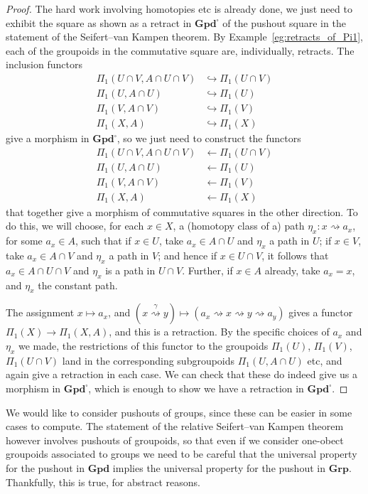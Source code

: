 \documentclass{tufte-handout}
\def\into {\hookrightarrow}
\def\Grp {\mathbf{Grp}}
\def\Gpd {\mathbf{Gpd}}
\theoremstyle{definition}
\begin{document}
\begin{proof}

The hard work involving homotopies etc is already done, we just need to exhibit the 
square as shown as a retract in $\Gpd^\square$ of the pushout square in the statement of 
the Seifert--van Kampen theorem. By Example~\ref{eg:retracts_of_Pi1}, each of the 
groupoids in the commutative square are, individually, retracts.
The inclusion functors
\begin{align*}
\Pi_1(U\cap V,A\cap U\cap V) & \into \Pi_1(U\cap V)\\
\Pi_1(U,A\cap U) & \into \Pi_1(U)\\
\Pi_1(V,A\cap V) & \into \Pi_1(V)\\
\Pi_1(X,A) & \into \Pi_1(X)
\end{align*}
give a morphism in $\Gpd^\square$, so we just need to construct the functors
\begin{align*}
\Pi_1(U\cap V,A\cap U\cap V) & \leftarrow \Pi_1(U\cap V)\\
\Pi_1(U,A\cap U) & \leftarrow \Pi_1(U)\\
\Pi_1(V,A\cap V) & \leftarrow \Pi_1(V)\\
\Pi_1(X,A) & \leftarrow \Pi_1(X)
\end{align*}
that together give a morphism of commutative squares in the other direction. To do this, 
we will choose, for each $x\in X$, a (homotopy class of a) path $\eta_x\colon 
x\rightsquigarrow a_x$, for some $a_x \in A$, such that if $x\in U$, take $a_x\in A\cap 
U$ and $\eta_x$ a path in $U$; if $x\in V$, take $a_x\in A\cap V$ and $\eta_x$ a path in 
$V$; and hence if $x\in U\cap V$, it follows that $a_x\in A\cap U\cap V$ and $\eta_x$ is 
a path in $U\cap V$. Further, if $x\in A$ already, take $a_x = x$, and $\eta_x$ the 
constant path.

The assignment $x\mapsto a_x$, and $(x\stackrel{\gamma}{\rightsquigarrow} y) \mapsto 
(a_x \rightsquigarrow x \rightsquigarrow y \rightsquigarrow a_y)$ gives a functor 
$\Pi_1(X) \to \Pi_1(X,A)$, and this is a retraction. By the specific choices of $a_x$ 
and $\eta_x$ we made, the restrictions of this functor to the groupoids $\Pi_1(U)$, 
$\Pi_1(V)$, $\Pi_1(U\cap V)$ land in the corresponding subgroupoids $\Pi_1(U,A\cap U)$ 
etc, and again give a retraction in each case. We can check that these do indeed give us 
a morphism in $\Gpd^\square$, which is enough to show we have a retraction in $\Gpd^\square$. 
\end{proof}

We would like to consider pushouts of groups, since these can be easier in some cases to 
compute. The statement of the relative Seifert--van Kampen theorem however involves 
pushouts of groupoids, so that even if we consider one-obect groupoids associated to 
groups we need to be careful that the universal property for the pushout in $\Gpd$ 
implies the universal property for the pushout in $\Grp$. Thankfully, this is true, for 
abstract reasons.
\end{document}
